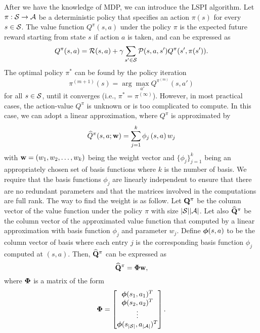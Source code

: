 After we have the knowledge of MDP, we can introduce the LSPI algorithm. Let $\pi:\mathcal{S}\rightarrow\mathcal{A}$ be a deterministic policy that specifies an action $\pi(s)$ for every $s\in\mathcal{S}$. The value function $Q^{\pi}\left(s,a\right)$ under the policy $\pi$ is the expected future reward starting from state $s$ if action $a$ is taken, and can be expressed as
\begin{equation}
    Q^{\pi}(s,a) = \mathcal{R}(s,a) + \gamma\sum_{s'\in\mathcal{S}}\mathcal{P}(s,a,s')Q^{\pi}(s',\pi(s')).
\end{equation}
The optimal policy $\pi^*$ can be found by the policy iteration
\begin{equation}
    \pi^{(m+1)}(s) = \arg\max_{a'} Q^{\pi^{(m)}}\left(s,a'\right)
\end{equation}
for all $s\in\mathcal{S}$, until it converges (i.e., $\pi^*=\pi^{(\infty)}$).
However, in most practical cases, the action-value $Q^\pi$ is unknown or is too complicated to compute. In this case, we can adopt a linear approximation, where $Q^\pi$ is approximated by \cite{lagoudakis:2003}
\begin{equation}\label{eq: value func approx.}
    \widehat{Q}^{\pi}(s,a;{\mathbf w}) = \sum_{j=1}^{k} \phi_j\left(s,a\right)w_j
\end{equation}
with ${\mathbf w} = \left(w_1,w_2,\ldots,w_k\right)$ being the weight vector and $\{\phi_j\}_{j=1}^k$ being an appropriately chosen set of basis functions where $k$ is the number of basis. We require that the basis functions $\phi_j$ are linearly independent to ensure that there are no redundant parameters and that the matrices involved in the computations are full rank. The way to find the weight is as follow. Let ${\mathbf Q}^\pi$ be the column vector of the value function under the policy $\pi$ with size $|\mathcal{S}||\mathcal{A}|$. Let also $\widehat {{\mathbf Q}}^\pi$ be the column vector of the approximated value function that computed by a linear approximation with basis function $\phi_j$ and parameter $w_j$. Define $\boldsymbol{\phi}(s,a)$ to be the column vector of basis where each entry $j$ is the corresponding basis function $\phi_j$ computed at $(s,a)$. Then, $\widehat {{\mathbf Q}}^\pi$ can be expressed as
\begin{equation}
    \widehat {{\mathbf Q}}^\pi = \boldsymbol{\Phi}{\mathbf w},
\end{equation}
where $\boldsymbol{\Phi}$ is a matrix of the form
\begin{equation}
    \boldsymbol{\Phi} =
    \begin{bmatrix}
        \boldsymbol{\phi}(s_1,a_1)^T \\
        \boldsymbol{\phi}(s_2,a_2)^T \\
        \vdots \\
        \boldsymbol{\phi}(s_{|\mathcal{S}|},a_{|\mathcal{A}|})^T
    \end{bmatrix}.
\end{equation}
